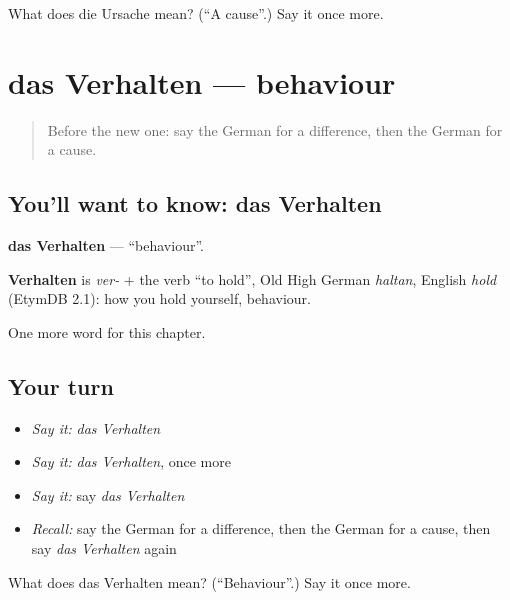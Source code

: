 \begin{tcolorbox}[breakable,colback=teal!4,colframe=teal!35!black,title={Before you move on}]
What does die Ursache mean? (\textquotedblleft{}A cause\textquotedblright{}.) Say it once more.
\end{tcolorbox}
\section[das Verhalten]{das Verhalten — behaviour}

\label{lesson:GE-C241-verhalten}



\begin{quote}
Before the new one: say the German for a difference, then the German for a cause.
\end{quote}

\subsection*{You'll want to know: das Verhalten}
\textbf{das Verhalten} — \textquotedblleft{}behaviour\textquotedblright{}.

\begin{cousinweb}
\textbf{Verhalten} is \emph{ver-} + the verb \textquotedblleft{}to hold\textquotedblright{}, Old High German \emph{haltan}, English \emph{hold} (EtymDB 2.1): how you hold yourself, behaviour.
\end{cousinweb}

\begin{grammarlens}[title={What you've built}]
One more word for this chapter.
\end{grammarlens}

\subsection*{Your turn}
\begin{itemize}
\raggedright
  \item \emph{Say it:} \emph{das Verhalten}
  \item \emph{Say it:} \emph{das Verhalten}, once more
  \item \emph{Say it:} say \emph{das Verhalten}
  \item \emph{Recall:} say the German for a difference, then the German for a cause, then say \emph{das Verhalten} again
\end{itemize}

\begin{tcolorbox}[breakable,colback=teal!4,colframe=teal!35!black,title={Before you move on}]
What does das Verhalten mean? (\textquotedblleft{}Behaviour\textquotedblright{}.) Say it once more.
\end{tcolorbox}
